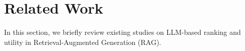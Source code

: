 \section{Related Work} 
In this section, we briefly review existing studies on LLM-based ranking and utility in  Retrieval-Augmented Generation (RAG).


